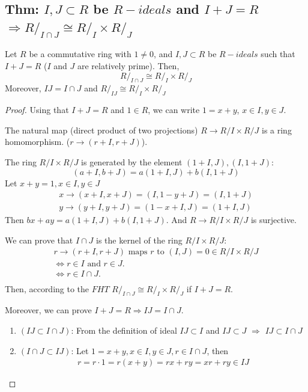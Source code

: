 \documentclass[11pt]{elegantbook}
\begin{document}
\subsection{Thm: $I,J\subset R$ be $R-ideals$ and $I+J=R$ $\Rightarrow R/_{I\cap J} \cong R/_I\times R/_J$}
\begin{theorem}
Let $R$ be a commutative ring with $1\neq 0$, and $I,J\subset R$ be $R-ideals$ such that $I+J=R$ ($I$ and $J$ are relatively prime). Then,
$$R/_{I\cap J} \cong R/_I\times R/_J$$
Moreover, $IJ=I\cap J$ and $R/_{IJ} \cong R/_I\times R/_J$
\end{theorem}
\begin{proof}
    Using that $I+J=R$ and $1\in R$, we can write $1=x+y$, $x\in I,y\in J$.

    The natural map (direct product of two projections) $R \rightarrow	R/I\times R/J$ is a ring homomorphism. ($r \rightarrow (r+I,r+J)$).

    The ring $R/I\times R/J$ is generated by the element $(1+I,J),(I,1+J)$: $$(a+I,b+J)=a(1+I,J)+b(I,1+J)$$
    Let $x+y=1,x\in I,y\in J$
    \begin{equation}
        \begin{aligned}
            x \rightarrow (x+I,x+J)=(I,1-y+J)=(I,1+J)\\
            y \rightarrow (y+I,y+J)=(1-x+I,J)=(1+I,J)
        \end{aligned}
        \nonumber
    \end{equation}
    Then $bx+ay=a(1+I,J)+b(I,1+J)$. And $R \rightarrow R/I\times R/J$ is surjective.

    We can prove that $I\cap J$ is the kernel of the ring $R/I\times R/J$:
    \begin{equation}
        \begin{aligned}
            r \rightarrow (r+I,r+J)\text{ maps }r \text{ to }(I,J)=0\in R/I\times R/J\\
            \Leftrightarrow	r\in I\text{ and }r\in J.\\
            \Leftrightarrow	r\in I\cap J.\\
        \end{aligned}
        \nonumber
    \end{equation}
    Then, according to the $FHT$
    $R/_{I\cap J} \cong R/_I\times R/_J$ if $I+J=R$.

    Moreover, we can prove $I+J=R \Rightarrow IJ=I\cap J$.
    \begin{enumerate}
        \item $(IJ\subset I\cap J)$: From the definition of ideal $IJ\subset I$ and $IJ\subset J$ $\Rightarrow$ $IJ\subset I\cap J$
        \item $(I\cap J\subset IJ)$: Let $1=x+y,x\in I, y\in J, r\in I\cap J$, then
        \begin{equation}
            \begin{aligned}
                r=r\cdot 1=r(x+y)=rx+ry=xr+ry\in IJ
            \end{aligned}
            \nonumber
        \end{equation}
    \end{enumerate}
\end{proof}
\end{document}
